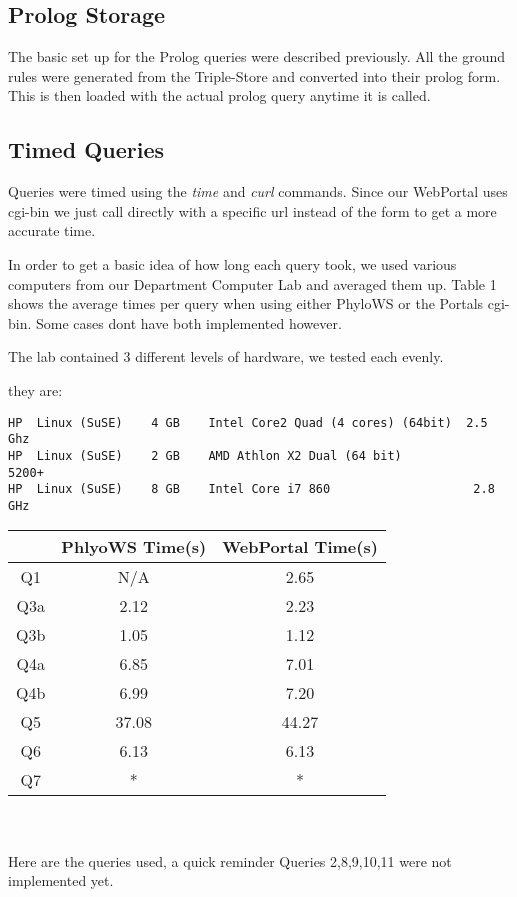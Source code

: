 \documentclass[10pt]{article}
\begin{document}
\subsection{Prolog Storage}

The basic set up for the Prolog queries were described previously.  All the
ground rules were generated from the Triple-Store and converted into their
prolog form.  This is then loaded with the actual prolog query anytime it is
called.

\subsection{Timed Queries}

Queries were timed using the \emph{time} and \emph{curl} commands.  Since our
WebPortal uses cgi-bin we just call directly with a specific url instead of the
form to get a more accurate time.

In order to get a basic idea of how long each query took, we used various
computers from our Department Computer Lab and averaged them up.  Table 1 shows
the average times per query when using either PhyloWS or the Portals cgi-bin.
Some cases dont have both implemented however.

The lab contained 3 different levels of hardware, we tested each evenly.

they are:\begin{verbatim}
HP 	Linux (SuSE) 	4 GB 	Intel Core2 Quad (4 cores) (64bit) 	2.5 Ghz
HP 	Linux (SuSE) 	2 GB 	AMD Athlon X2 Dual (64 bit) 	       5200+
HP 	Linux (SuSE) 	8 GB 	Intel Core i7 860 	                 2.8 GHz
\end{verbatim}

\begin{tabular}{|c|c|c|}
\hline
        & PhlyoWS Time(s) & WebPortal Time(s) \\ \hline
Q1   &  N/A                &   2.65   \\ \hline
Q3a &  2.12                      & 2.23 \\ \hline
Q3b &  1.05                      & 1.12 \\ \hline
Q4a   & 6.85                       &7.01 \\ \hline
Q4b & 6.99               &  7.20\\ \hline
Q5   &  37.08                      & 44.27\\ \hline
Q6   & 6.13                       &6.13\\ \hline
Q7   &   *                     & *\\ \hline
\end{tabular}
\\
\\
Here are the queries used, a quick reminder Queries 2,8,9,10,11 were not implemented yet.
\end{document}

